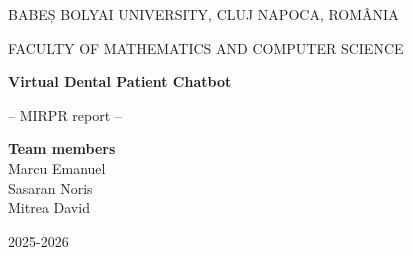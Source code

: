 \documentclass[runningheads,a4paper,11pt]{report}
\begin{document}
\begin{titlepage}
\sloppy

\begin{center}
BABEȘ BOLYAI UNIVERSITY, CLUJ NAPOCA, ROMÂNIA

FACULTY OF MATHEMATICS AND COMPUTER SCIENCE

\vspace{6cm}

\Huge \textbf{Virtual Dental Patient Chatbot}

\vspace{1cm}

\normalsize -- MIRPR report --

\end{center}

\vspace{5cm}

\begin{flushright}
\Large{\textbf{Team members}}\\
Marcu Emanuel\\
Sasaran Noris\\
Mitrea David
\end{flushright}

\vspace{4cm}

\begin{center}
2025-2026
\end{center}

\end{titlepage}

\end{document}
